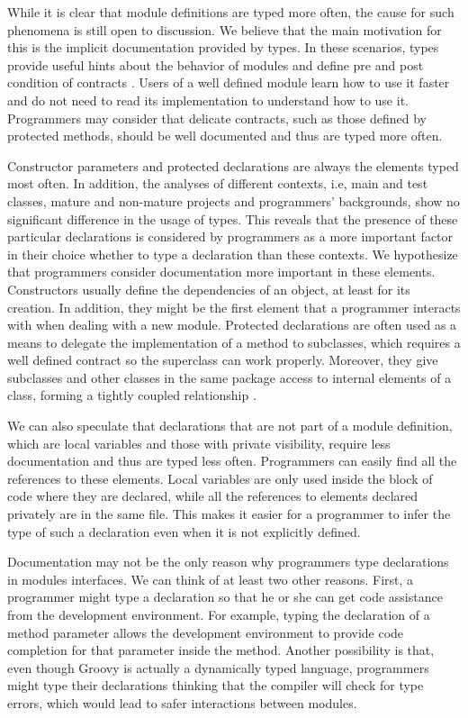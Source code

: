 \documentclass[msc]{ppgccufmg}
\begin{document}
While it is clear that module definitions are typed more often, the cause for such phenomena is still open to discussion.
We believe that the main motivation for this is the implicit documentation provided by types.
In these scenarios, types provide useful hints about the behavior of modules \cite{Curtis1987} and define pre and post condition of contracts
\cite{Meyer88, Meijer04, Wadler04, Plosch97, Flanagan2006, Furr09}.
Users of a well defined module learn how to use it faster and do not need to read its implementation to understand how to use it.
Programmers may consider that delicate contracts, such as those defined by protected methods, should be well documented and thus are typed more often.

Constructor parameters and protected declarations are always the elements typed most often.
In addition, the analyses of different contexts, i.e, main and test classes, mature and non-mature projects and programmers' backgrounds, show no significant difference in the usage of types.
This reveals that the presence of these particular declarations is considered by programmers as a more important factor in their choice whether to type a declaration than these contexts.
We hypothesize that programmers consider documentation more important in these elements.
Constructors usually define the dependencies of an object, at least for its creation.
In addition, they might be the first element that a programmer interacts with when dealing with a new module.
Protected declarations are often used as a means to delegate the implementation of a method to subclasses, which requires a well defined contract so the superclass can work properly.
Moreover, they give subclasses and other classes in the same package access to internal elements of a class, forming a tightly coupled relationship \cite{Chidamber94}.


We can also speculate that declarations that are not part of a module definition, which are local variables and those with private visibility, require less documentation and thus are typed less often.
Programmers can easily find all the references to these elements.
Local variables are only used inside the block of code where they are declared, while all the references to elements declared privately are in the same file.
This makes it easier for a programmer to infer the type of such a declaration even when it is not explicitly defined.

Documentation may not be the only reason why programmers type declarations in modules interfaces.
We can think of at least two other reasons.
First, a programmer might type a declaration so that he or she can get code assistance from the development environment.
For example, typing the declaration of a method parameter allows the development environment to provide code completion for that parameter inside the method.
Another possibility is that, even though Groovy is actually a dynamically typed language, programmers might type their declarations thinking that the compiler will check for type errors, which would lead to safer interactions between modules.
\end{document}
